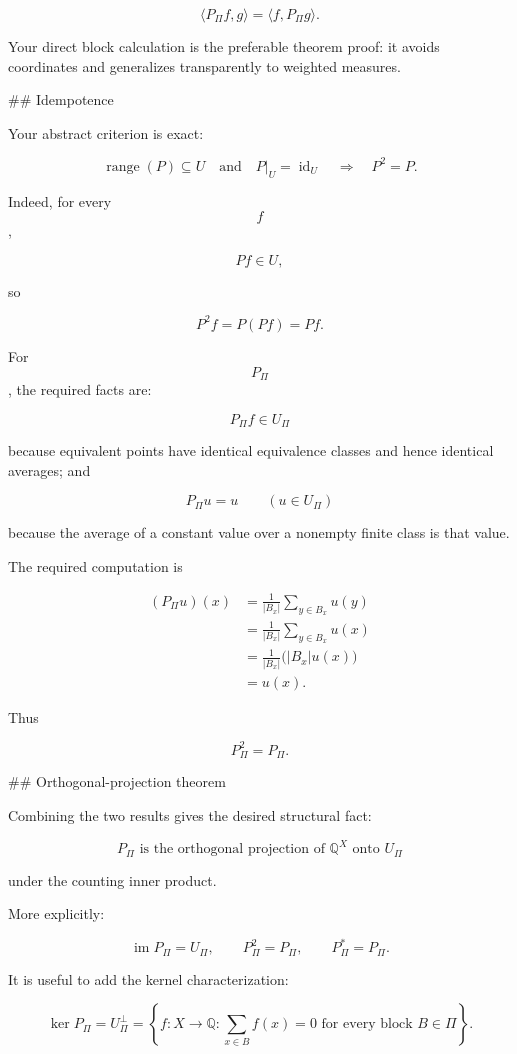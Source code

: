$$
\boxed{
\langle P_\Pi f,g\rangle
=
\langle f,P_\Pi g\rangle.
}
$$

Your direct block calculation is the preferable theorem proof: it avoids coordinates and generalizes transparently to weighted measures.

## Idempotence

Your abstract criterion is exact:

$$
\boxed{
\operatorname{range}(P)\subseteq U
\quad\text{and}\quad
P|_U=\operatorname{id}_U
\quad\Longrightarrow\quad
P^2=P.
}
$$

Indeed, for every $$f$$,

$$
Pf\in U,
$$

so

$$
P^2f=P(Pf)=Pf.
$$

For $$P_\Pi$$, the required facts are:

$$
P_\Pi f\in U_\Pi
$$

because equivalent points have identical equivalence classes and hence identical averages; and

$$
P_\Pi u=u
\qquad
(u\in U_\Pi)
$$

because the average of a constant value over a nonempty finite class is that value.

The required computation is

$$
\begin{aligned}
(P_\Pi u)(x)
&=
\frac1{|B_x|}
\sum_{y\in B_x}u(y)\\
&=
\frac1{|B_x|}
\sum_{y\in B_x}u(x)\\
&=
\frac1{|B_x|}\bigl(|B_x|u(x)\bigr)\\
&=
u(x).
\end{aligned}
$$

Thus

$$
\boxed{
P_\Pi^2=P_\Pi.
}
$$

## Orthogonal-projection theorem

Combining the two results gives the desired structural fact:

$$
\boxed{
P_\Pi
\text{ is the orthogonal projection of }\mathbb Q^X
\text{ onto }U_\Pi
}
$$

under the counting inner product.

More explicitly:

$$
\operatorname{im}P_\Pi=U_\Pi,
\qquad
P_\Pi^2=P_\Pi,
\qquad
P_\Pi^\ast=P_\Pi.
$$

It is useful to add the kernel characterization:

$$
\ker P_\Pi
=
U_\Pi^\perp
=
\left\{
f:X\to\mathbb Q:
\sum_{x\in B}f(x)=0
\text{ for every block }B\in\Pi
\right\}.
$$

